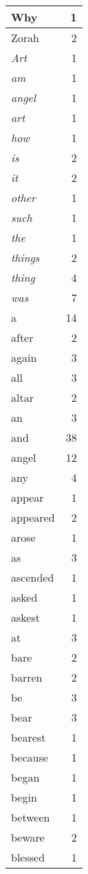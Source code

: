\begin{center}
\begin{longtable}{l|r}
Why & 1\\ \hline 
Zorah & 2\\ \hline 
\emph{Art} & 1\\ \hline 
\emph{am} & 1\\ \hline 
\emph{angel} & 1\\ \hline 
\emph{art} & 1\\ \hline 
\emph{how} & 1\\ \hline 
\emph{is} & 2\\ \hline 
\emph{it} & 2\\ \hline 
\emph{other} & 1\\ \hline 
\emph{such} & 1\\ \hline 
\emph{the} & 1\\ \hline 
\emph{things} & 2\\ \hline 
\emph{thing} & 4\\ \hline 
\emph{was} & 7\\ \hline 
a & 14\\ \hline 
after & 2\\ \hline 
again & 3\\ \hline 
all & 3\\ \hline 
altar & 2\\ \hline 
an & 3\\ \hline 
and & 38\\ \hline 
angel & 12\\ \hline 
any & 4\\ \hline 
appear & 1\\ \hline 
appeared & 2\\ \hline 
arose & 1\\ \hline 
as & 3\\ \hline 
ascended & 1\\ \hline 
asked & 1\\ \hline 
askest & 1\\ \hline 
at & 3\\ \hline 
bare & 2\\ \hline 
barren & 2\\ \hline 
be & 3\\ \hline 
bear & 3\\ \hline 
bearest & 1\\ \hline 
because & 1\\ \hline 
began & 1\\ \hline 
begin & 1\\ \hline 
between & 1\\ \hline 
beware & 2\\ \hline 
blessed & 1\\ \hline 

\end{longtable}
\end{center}
